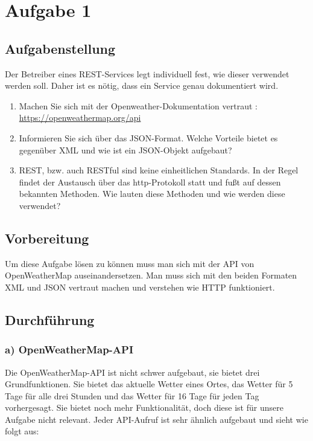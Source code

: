 \newpage

\section{Aufgabe 1}

\subsection{Aufgabenstellung}
Der Betreiber eines REST-Services legt individuell fest, wie dieser verwendet werden soll. Daher ist es nötig, dass ein Service genau dokumentiert wird.
\begin{enumerate}[label=(\alph*)]
\item Machen Sie sich mit der Openweather-Dokumentation vertraut : \url{https://openweathermap.org/api}

\item Informieren Sie sich über das JSON-Format. Welche Vorteile bietet es gegenüber XML und wie ist ein JSON-Objekt aufgebaut?

\item REST, bzw. auch RESTful sind keine einheitlichen Standards. In der Regel findet der Austausch über das http-Protokoll statt und fußt auf dessen bekannten Methoden. Wie lauten diese Methoden und wie werden diese verwendet?
\end{enumerate}

\subsection{Vorbereitung}
Um diese Aufgabe lösen zu können muss man sich mit der API von OpenWeatherMap auseinandersetzen. Man muss sich mit den beiden Formaten XML und JSON vertraut machen und verstehen wie HTTP funktioniert.

\subsection{Durchführung}
\subsubsection{a) OpenWeatherMap-API}
Die OpenWeatherMap-API ist nicht schwer aufgebaut, sie bietet drei Grundfunktionen. Sie bietet das aktuelle Wetter eines Ortes, das Wetter für 5 Tage für alle drei Stunden und das Wetter für 16 Tage für jeden Tag vorhergesagt. Sie bietet noch mehr Funktionalität, doch diese ist für unsere Aufgabe nicht relevant. Jeder API-Aufruf ist sehr ähnlich aufgebaut und sieht wie folgt aus:

